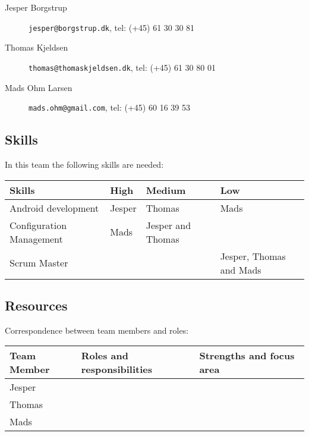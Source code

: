 \documentclass[a4paper,11pt]{article}
\begin{document}
\begin{description}
\item[Jesper Borgstrup] {\tt jesper@borgstrup.dk}, tel: (+45) 61 30 30 81
\item[Thomas Kjeldsen] {\tt thomas@thomaskjeldsen.dk}, tel: (+45) 61 30 80 01
\item[Mads Ohm Larsen] {\tt mads.ohm@gmail.com}, tel: (+45) 60 16 39 53
\end{description}

\subsection{Skills} %
\label{subsec:skills}
In this team the following skills are needed:

\begin{tabular}{|p{4cm}|p{2cm}|p{3.5cm}|p{3.5cm}|}
\hline
\textbf{Skills}                   & \textbf{High}   & \textbf{Medium} & \textbf{Low} 					 \\\hline
Android development      & Jesper & Thomas & Mads 					 \\\hline
Configuration Management & Mads & Jesper and Thomas       &      					 \\\hline
Scrum Master             &        &        & Jesper, Thomas and Mads \\\hline 
\end{tabular}

\subsection{Resources} %
\label{subsec:resources}
Correspondence between team members and roles:

\begin{tabular}{|p{3cm}|p{5cm}|p{5cm}|}
\hline
\textbf{Team Member}              & \textbf{Roles and responsibilities}   & \textbf{Strengths and focus area} \\\hline
Jesper                   &                              &                          \\\hline
Thomas                   &                              &                          \\\hline
Mads                     &                              &                          \\\hline 
\end{tabular}

\end{document}
